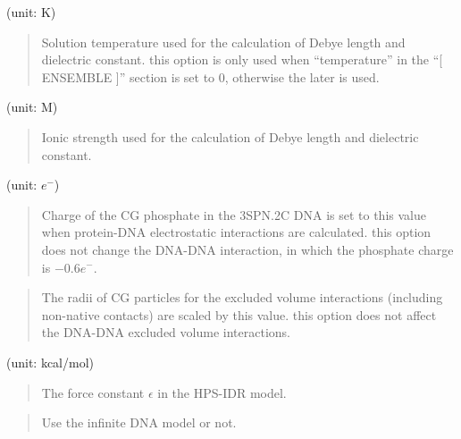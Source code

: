 \documentclass[a4paper,11pt,oneside,english]{sphinxmanual}
\begin{document}
  (unit: K)
\begin{quote}


Solution temperature used for the calculation of Debye length and dielectric
constant.  this option is only used when “temperature” in the “{[}
ENSEMBLE {]}” section is set to 0, otherwise the later is used.
\end{quote}

  (unit: M)
\begin{quote}


Ionic strength used for the calculation of Debye length and dielectric constant.
\end{quote}

  (unit: \(e^{-}\))
\begin{quote}


Charge of the CG phosphate in the 3SPN.2C DNA is set to this value when
protein-DNA electrostatic interactions are calculated.   this option
does not change the DNA-DNA interaction, in which the phosphate charge is
\(-0.6e^{-}\).
\end{quote}

 
\begin{quote}


The radii of CG particles for the excluded volume interactions (including
non-native contacts) are scaled by this value.   this option does not
affect the DNA-DNA excluded volume interactions.
\end{quote}

  (unit: kcal/mol)
\begin{quote}


The force constant \(\epsilon\) in the HPS-IDR model.
\end{quote}

 
\begin{quote}


Use the infinite DNA model or not.
\end{quote}
\end{document}
